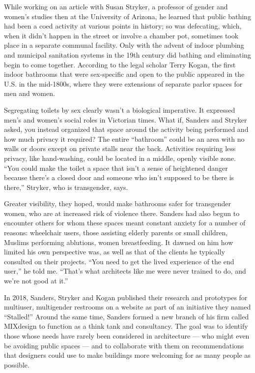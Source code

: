 While working on an article with Susan Stryker, a professor of gender
and women's studies then at the University of Arizona, he learned that
public bathing had been a coed activity at various points in history; so
was defecating, which, when it didn't happen in the street or involve a
chamber pot, sometimes took place in a separate communal facility. Only
with the advent of indoor plumbing and municipal sanitation systems in
the 19th century did bathing and eliminating begin to come together.
According to the legal scholar Terry Kogan, the first indoor bathrooms
that were sex-specific and open to the public appeared in the U.S. in
the mid-1800s, where they were extensions of separate parlor spaces for
men and women.

Segregating toilets by sex clearly wasn't a biological imperative. It
expressed men's and women's social roles in Victorian times. What if,
Sanders and Stryker asked, you instead organized that space around the
activity being performed and how much privacy it required? The entire
``bathroom'' could be an area with no walls or doors except on private
stalls near the back. Activities requiring less privacy, like
hand-washing, could be located in a middle, openly visible zone. ``You
could make the toilet a space that isn't a sense of heightened danger
because there's a closed door and someone who isn't supposed to be there
is there,'' Stryker, who is transgender, says.

Greater visibility, they hoped, would make bathrooms safer for
transgender women, who are at increased risk of violence there. Sanders
had also begun to encounter others for whom these spaces meant constant
anxiety for a number of reasons: wheelchair users, those assisting
elderly parents or small children, Muslims performing ablutions, women
breastfeeding. It dawned on him how limited his own perspective was, as
well as that of the clients he typically consulted on their projects.
``You need to get the lived experience of the end user,'' he told me.
``That's what architects like me were never trained to do, and we're not
good at it.''

In 2018, Sanders, Stryker and Kogan published their research and
prototypes for multiuser, multigender restrooms on a website as part of
an initiative they named ``Stalled!'' Around the same time, Sanders
formed a new branch of his firm called MIXdesign to function as a think
tank and consultancy. The goal was to identify those whose needs have
rarely been considered in architecture --- who might even be avoiding
public spaces --- and to collaborate with them on recommendations that
designers could use to make buildings more welcoming for as many people
as possible.

